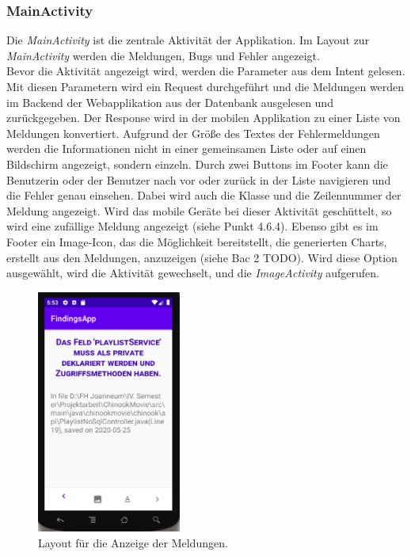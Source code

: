 \subsubsection{MainActivity}
Die \textit{MainActivity} ist die zentrale Aktivität der Applikation. Im Layout zur \textit{MainActivity} werden die Meldungen, Bugs und Fehler angezeigt. \\ Bevor die Aktivität angezeigt wird, werden die Parameter aus dem Intent gelesen. Mit diesen Parametern wird ein Request durchgeführt und die Meldungen werden im Backend der Webapplikation aus der Datenbank ausgelesen und zurückgegeben. Der Response wird in der mobilen Applikation zu einer Liste von Meldungen konvertiert. Aufgrund der Größe des Textes der Fehlermeldungen werden die Informationen nicht in einer gemeinsamen Liste oder auf einen Bildschirm angezeigt, sondern einzeln. Durch zwei Buttons im Footer kann die Benutzerin oder der Benutzer  nach vor oder zurück in der Liste navigieren und die Fehler genau einsehen. Dabei wird auch die Klasse und die Zeilennummer der Meldung angezeigt. Wird das mobile Geräte bei dieser Aktivität geschüttelt, so wird eine zufällige Meldung angezeigt (siehe Punkt 4.6.4). Ebenso gibt es im Footer ein Image-Icon, das die Möglichkeit bereitstellt, die generierten Charts, erstellt aus den Meldungen, anzuzeigen (siehe Bac 2 TODO). Wird diese Option ausgewählt, wird die Aktivität gewechselt, und die \textit{ImageActivity} aufgerufen.
\begin{figure}[tp]
  \centering
  \includegraphics[height=8cm]{images/androidFindingScreen.PNG}
 \caption[Layout für die Anzeige der Meldungen.]{Layout für die Anzeige der Meldungen.}
  \label{fig:findingsInIDE}
\end{figure}
